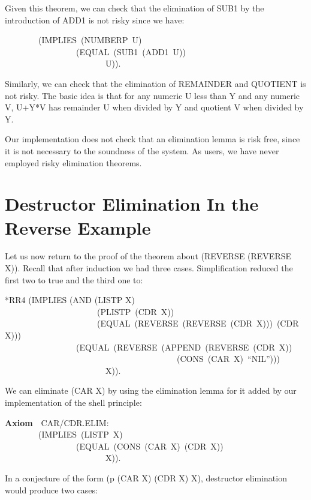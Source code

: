 \documentclass[10pt]{book}
\newenvironment{pubasis}{\begin{flushleft}}{\end{flushleft}}
\newcommand{\axiomordefinition}[1]{\vspace{6pt}\Large\textsf{\textbf{#1}}\normalsize}
\begin{document}
Given this theorem, we can check that the elimination
of SUB1 by the introduction of ADD1 is not risky since
we have:
\begin{pubasis}
~~~~~~~~(IMPLIES~(NUMBERP~U)\\
~~~~~~~~~~~~~~~~~(EQUAL~(SUB1~(ADD1~U))\\
~~~~~~~~~~~~~~~~~~~~~~~~U)).\\
\end{pubasis}
Similarly, we can check that the elimination of
REMAINDER and QUOTIENT is not risky.  The basic
idea is that for any numeric U less than Y and any numeric
V,  U+Y*V has remainder U when divided by Y
and quotient V when divided by Y.

Our implementation does not check that
an elimination lemma is risk free, since it
is not necessary to the soundness of the system.
As users, we have never employed risky elimination
theorems.

\section{Destructor Elimination In the Reverse Example}
Let us now return to the proof of the theorem about (REVERSE (REVERSE X)).
Recall that after induction we had three cases.  Simplification reduced
the first two to true and the third one to:

\begin{pubasis}
*RR4	(IMPLIES (AND (LISTP X)\\
~~~~~~~~~~~~~~~~~~~~~~(PLISTP~(CDR~X))\\
~~~~~~~~~~~~~~~~~~~~~~(EQUAL~(REVERSE~(REVERSE~(CDR~X)))~(CDR~X)))\\
~~~~~~~~~~~~~~~~~(EQUAL~(REVERSE~(APPEND~(REVERSE~(CDR~X))\\
~~~~~~~~~~~~~~~~~~~~~~~~~~~~~~~~~~~~~~~~~(CONS~(CAR~X)~``NIL'')))\\
~~~~~~~~~~~~~~~~~~~~~~~~X)).\\
\end{pubasis}
We can eliminate (CAR X) by using the elimination lemma
for it added by our implementation of the shell principle:

\begin{pubasis}
\axiomordefinition{Axiom}~~CAR/CDR.ELIM:\\
~~~~~~~~(IMPLIES~(LISTP~X)\\
~~~~~~~~~~~~~~~~~(EQUAL~(CONS~(CAR~X)~(CDR~X))\\
~~~~~~~~~~~~~~~~~~~~~~~~X)).\\
\end{pubasis}
In a conjecture of the form (p (CAR X) (CDR X) X), destructor elimination
would produce two cases:
\end{document}
